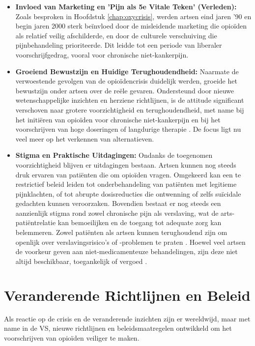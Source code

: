 \documentclass[11pt, a4paper]{report} %
\begin{document}
\begin{itemize}
    \item \textbf{Invloed van Marketing en 'Pijn als 5e Vitale Teken' (Verleden):} Zoals besproken in Hoofdstuk \ref{chap:oxycrisis}, werden artsen eind jaren '90 en begin jaren 2000 sterk beïnvloed door de misleidende marketing die opioïden als relatief veilig afschilderde, en door de culturele verschuiving die pijnbehandeling prioriteerde. Dit leidde tot een periode van liberaler voorschrijfgedrag, vooral voor chronische niet-kankerpijn.
    \item \textbf{Groeiend Bewustzijn en Huidige Terughoudendheid:} Naarmate de verwoestende gevolgen van de opioïdencrisis duidelijk werden, groeide het bewustzijn onder artsen over de reële gevaren. Ondersteund door nieuwe wetenschappelijke inzichten en herziene richtlijnen, is de attitude significant verschoven naar grotere voorzichtigheid en terughoudendheid, met name bij het initiëren van opioïden voor chronische niet-kankerpijn en bij het voorschrijven van hoge doseringen of langdurige therapie \parencite{AAFP2024OpioidDecrease}. De focus ligt nu veel meer op het verkennen van alternatieven.
    \item \textbf{Stigma en Praktische Uitdagingen:} Ondanks de toegenomen voorzichtigheid blijven er uitdagingen bestaan. Artsen kunnen nog steeds druk ervaren van patiënten die om opioïden vragen. Omgekeerd kan een te restrictief beleid leiden tot onderbehandeling van patiënten met legitieme pijnklachten, of tot abrupte dosisreducties die ontwenning of zelfs suïcidale gedachten kunnen veroorzaken. Bovendien bestaat er nog steeds een aanzienlijk stigma rond zowel chronische pijn als verslaving, wat de arts-patiëntrelatie kan bemoeilijken en de toegang tot adequate zorg kan belemmeren. Zowel patiënten als artsen kunnen terughoudend zijn om openlijk over verslavingsrisico's of -problemen te praten \parencite{BMJOpen2022GPAttitudes, CDCPreventingOverdose}. Hoewel veel artsen de voorkeur geven aan niet-medicamenteuze behandelingen, zijn deze niet altijd beschikbaar, toegankelijk of vergoed \parencite{CDCPreventingOverdose}.
\end{itemize}

\section{Veranderende Richtlijnen en Beleid}
Als reactie op de crisis en de veranderende inzichten zijn er wereldwijd, maar met name in de VS, nieuwe richtlijnen en beleidsmaatregelen ontwikkeld om het voorschrijven van opioïden veiliger te maken.
\end{document}
